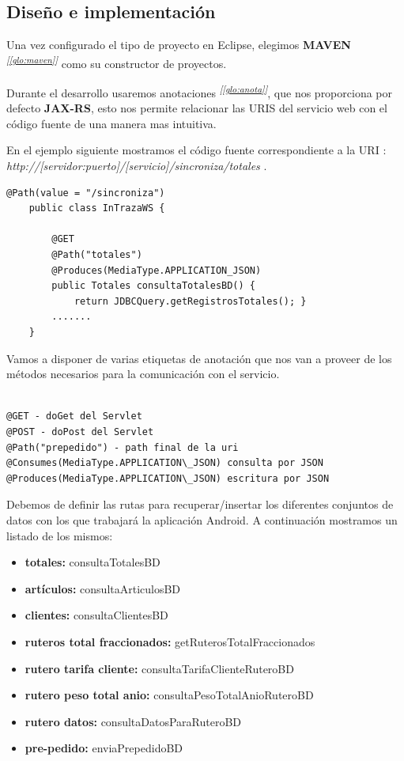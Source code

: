 \subsection{Diseño e implementación}
Una vez configurado el tipo de proyecto en Eclipse, elegimos \textbf{MAVEN} \textsuperscript{\textit{[\ref{glo:maven}]}} como su constructor de proyectos.

Durante el desarrollo usaremos anotaciones \textsuperscript{\textit{[\ref{glo:anota}]}}, que nos proporciona por defecto \textbf{JAX-RS}, esto nos permite relacionar las URIS del servicio web con el código fuente de una manera mas intuitiva. 

En el ejemplo siguiente mostramos el código fuente correspondiente a la URI : \textit{http://[servidor:puerto]/[servicio]/sincroniza/totales }.\\


\begin{lstlisting}[style=JAVA]
	@Path(value = "/sincroniza")
	public class InTrazaWS {
		
		@GET
		@Path("totales")
		@Produces(MediaType.APPLICATION_JSON)
		public Totales consultaTotalesBD() { 
			return JDBCQuery.getRegistrosTotales(); }	
		.......		
	}
\end{lstlisting}

Vamos a disponer de varias etiquetas de anotación que nos van a proveer de los métodos necesarios para la comunicación con el servicio.

\begin{lstlisting}

@GET - doGet del Servlet
@POST - doPost del Servlet
@Path("prepedido") - path final de la uri
@Consumes(MediaType.APPLICATION\_JSON) consulta por JSON
@Produces(MediaType.APPLICATION\_JSON) escritura por JSON 

\end{lstlisting}

Debemos de definir las rutas para recuperar/insertar los diferentes conjuntos de datos con los que trabajará la aplicación Android. A continuación mostramos un listado de los mismos:\\

\begin{itemize}	
	\item \textbf{totales: } consultaTotalesBD 
	\item \textbf{artículos: } consultaArticulosBD 
	\item \textbf{clientes: } consultaClientesBD 
	\item \textbf{ruteros total fraccionados: } getRuterosTotalFraccionados 
	\item \textbf{rutero tarifa cliente: } consultaTarifaClienteRuteroBD 
	\item \textbf{rutero peso total anio: } consultaPesoTotalAnioRuteroBD 
	\item \textbf{rutero datos: } consultaDatosParaRuteroBD
	\item \textbf{pre-pedido: } enviaPrepedidoBD	\\	
\end{itemize}
 
